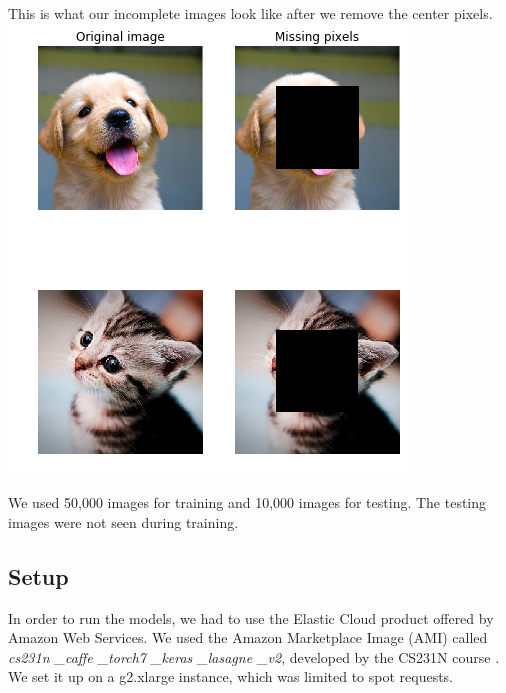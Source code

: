 \documentclass[10pt,twocolumn,letterpaper]{article}
\begin{document}
This is what our incomplete images look like after we remove the center pixels.\\
\includegraphics[width=1.0\linewidth]{img_sample.png}

We used 50,000 images for training and 10,000 images for testing. The testing images were not seen during training.

\subsection{Setup}
In order to run the models, we had to use the Elastic Cloud product offered by Amazon Web Services. We used the Amazon Marketplace Image (AMI) called \textit{cs231n \_caffe \_torch7 \_keras \_lasagne \_v2}, developed by the CS231N course \cite{aws_tutorial}. We set it up on a g2.xlarge instance, which was limited to spot requests. 
\end{document}

